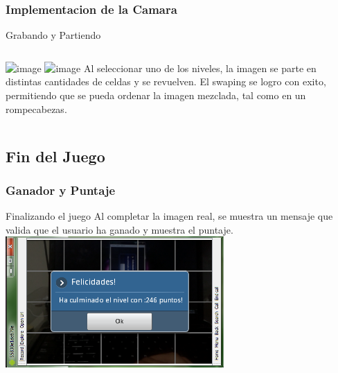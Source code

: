 \documentclass[serif,11pt]{beamer}
\begin{document}
		\begin{frame}
			\frametitle{Implementacion de la Camara}
				\begin{block}{Grabando y Partiendo}
					\begin{columns}
						 \hspace{0.1cm}
						\includegraphics<1>[width=\textwidth]{inter} 
						\includegraphics<2>[width=\textwidth]{completando} 
						Al seleccionar uno de los niveles, la imagen se parte en distintas cantidades de celdas y se revuelven.  El swaping se logro con exito, permitiendo que 
						se pueda ordenar la imagen mezclada, tal como en un rompecabezas.
											
					\end{columns}
				\end{block}
		\end{frame}


	\subsection{Fin del Juego}
		\begin{frame}
			\frametitle{Ganador y Puntaje}
				\begin{block}{Finalizando el juego}
				Al completar la imagen real, se muestra un mensaje que valida que el usuario ha ganado y muestra el puntaje.
				\includegraphics[height=5cm]{gano} 
				
				\end{block}
		\end{frame}

	
\end{document}
